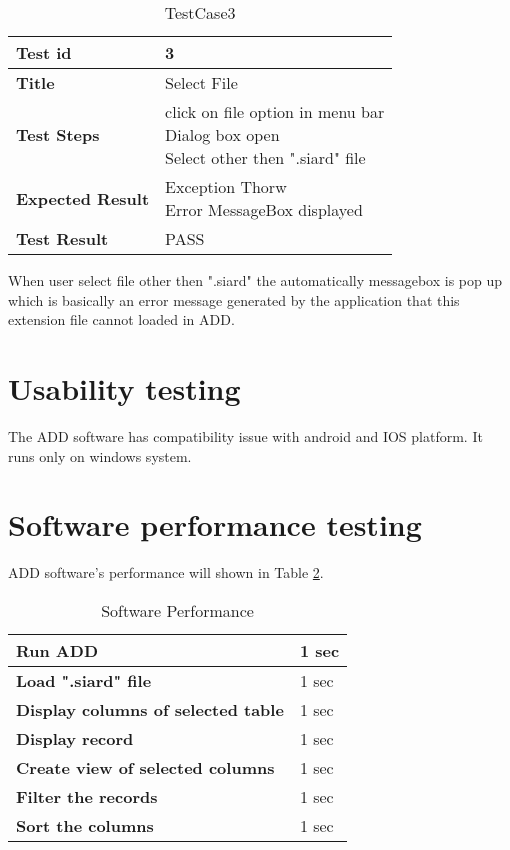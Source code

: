 \begin{enumerate}
\begin{table}[]
\centering
\begin{tabular}{|l|l|}
\hline
\bfseries Test id          & 3                 \\
\hline
\bfseries Title        & Select File \\
\hline
\bfseries  Test Steps        & \makecell{click on file option in menu bar \\ Dialog box open \\Select other then ".siard" file}          \\
\hline
\bfseries Expected Result & \makecell{Exception Thorw \\ Error MessageBox displayed}         \\
\hline
\bfseries Test Result & PASS \\
\hline                   
\end{tabular}
\caption{TestCase3}
\label{TestCase3}
\end{table}

\par When user select file other then ".siard" the automatically messagebox is pop up which is basically an error message generated by the application that this extension file cannot loaded in ADD.
	\end{enumerate}
	
  \section{Usability testing}
	The ADD software has compatibility issue with android and IOS platform. It runs only on windows system.
	
	\section{Software performance testing}
	ADD software's performance will shown in Table \ref{Software Performance}.
	\begin{table}[]
\centering
\begin{tabular}{|l|l|}
\hline
\bfseries Run ADD                                 &  1 sec         \\
\hline
\bfseries Load ".siard" file                      &  1 sec       \\
\hline
\bfseries Display columns of selected table       &  1 sec         \\
\hline
\bfseries Display record                          &  1 sec       \\
\hline
\bfseries Create view of selected columns         &  1 sec       \\
\hline
\bfseries Filter the records                      &  1 sec       \\
\hline
\bfseries Sort the columns                        &  1 sec       \\     
\hline
\end{tabular}
\caption{Software Performance}
\label{Software Performance}
\end{table}

